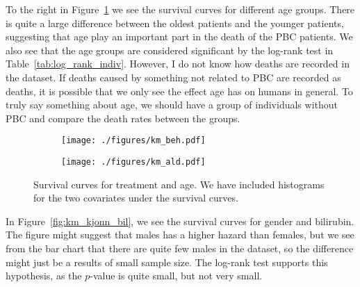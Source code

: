 \documentclass[11pt,a4paper]{article}
\begin{document}
To the right in Figure~\ref{fig:km_beh_ald} we see the survival curves for different age groups. There is quite a large difference between the oldest patients and the younger patients, suggesting that age play an important part in the death of the PBC patients. We also see that the age groups are considered significant by the log-rank test in Table~\ref{tab:log_rank_indiv}.
However, I do not know how deaths are recorded in the dataset. If deaths caused by something not related to PBC are recorded as deaths, it is possible that we only see the effect age has on humans in general.  To truly say something about age, we should have a group of individuals without PBC and compare the death rates between the groups.
%
\begin{figure}[h!tbp]
    \centering
    \begin{subfigure}[b]{0.48\textwidth}
        \texttt{[image: ./figures/km\_beh.pdf]}
    \end{subfigure}%
    \quad
    \begin{subfigure}[b]{0.48\textwidth}
        \texttt{[image: ./figures/km\_ald.pdf]}
    \end{subfigure}
    \vspace{1\baselineskip}
    \caption{Survival curves for treatment and age. We have included histograms for the two covariates under the survival curves.}
    \label{fig:km_beh_ald}
\end{figure}

In Figure~\ref{fig:km_kjonn_bil}, we see the survival curves for gender and bilirubin. The figure might suggest that males has a higher hazard than females, but we see from the bar chart that there are quite few males in the dataset, so the difference might just be a results of small sample size. The log-rank test supports this hypothesis, as the $p$-value is quite small, but not very small.
\end{document}
